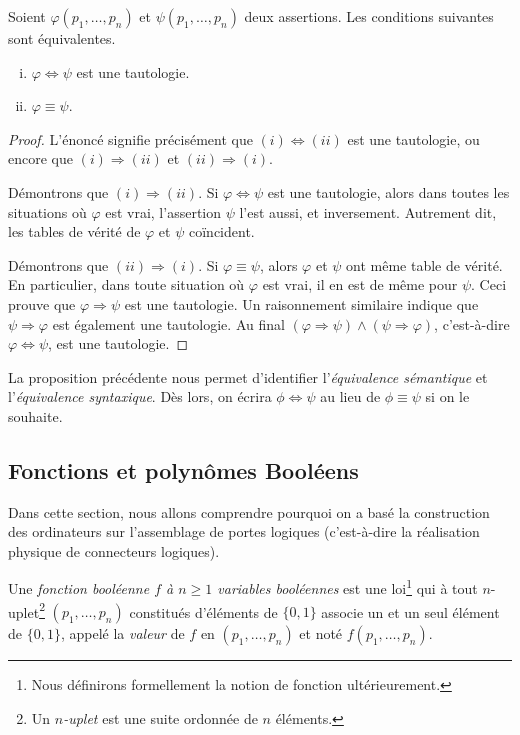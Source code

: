 \documentclass[french,course,oneside,theoremnosection]{lecture}
\newcommand{\iimplies}{\Rightarrow}
\newcommand{\ifff}{\Leftrightarrow}
\begin{document}
\begin{proposition}\label{prop:eq}
Soient $\varphi(p_1, \ldots, p_n)$ et $\psi(p_1, \ldots, p_n)$ deux assertions. Les conditions suivantes sont équivalentes.
\begin{enumerate}[(i)]
\item $\varphi \ifff \psi$ est une tautologie.
\item $\varphi \equiv \psi$.
\end{enumerate}
\end{proposition}
\begin{proof}
L'énoncé signifie précisément que $(i) \ifff (ii)$ est une tautologie, ou encore que $(i) \iimplies (ii)$ et $(ii) \iimplies (i)$.

Démontrons que $(i) \iimplies (ii)$. Si $\varphi \ifff \psi$ est une tautologie, alors dans toutes les situations où $\varphi$ est vrai, l'assertion $\psi$ l'est aussi, et inversement. Autrement dit, les tables de vérité de $\varphi$ et $\psi$ coïncident.

Démontrons que $(ii) \iimplies (i)$. Si $\varphi \equiv \psi$, alors $\varphi$ et $\psi$ ont même table de vérité. En particulier, dans toute situation où $\varphi$ est vrai, il en est de même pour $\psi$. Ceci prouve que $\varphi \iimplies \psi$ est une tautologie. Un raisonnement similaire indique que $\psi \iimplies \varphi$ est également une tautologie. Au final $(\varphi \iimplies \psi) \wedge (\psi \iimplies \varphi)$, c'est-à-dire $\varphi \ifff \psi$, est une tautologie.
\end{proof}

La proposition précédente nous permet d'identifier l'\emph{équivalence sémantique} et l'\emph{équivalence syntaxique}. Dès lors, on écrira $\phi \ifff \psi$ au lieu de $\phi \equiv \psi$ si on le souhaite.

\subsection{Fonctions et polynômes Booléens}

Dans cette section, nous allons comprendre pourquoi on a basé la construction des ordinateurs sur l'assemblage de portes logiques (c'est-à-dire la réalisation physique de connecteurs logiques).

\begin{definition}
Une \emph{fonction booléenne $f$ à $n\geq 1$ variables booléennes} est une loi\footnote{Nous définirons formellement la notion de fonction ultérieurement.} qui à tout $n$-uplet\footnote{Un \emph{$n$-uplet} est une suite ordonnée de $n$ éléments.} $(p_1, \ldots, p_n)$ constitués d’éléments de $\{0,1\}$ associe un et un seul élément de $\{0,1\}$, appelé la \emph{valeur} de $f$ en $(p_1, \ldots, p_n)$ et noté $f(p_1, \ldots, p_n)$. 
\end{definition}
\end{document}
